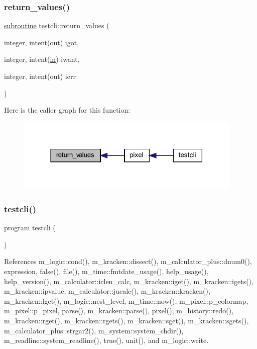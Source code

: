 \subsubsection{\texorpdfstring{return\+\_\+values()}{return\_values()}}
{\footnotesize\ttfamily \hyperlink{M__stopwatch_83_8txt_acfbcff50169d691ff02d4a123ed70482}{subroutine} testcli\+::return\+\_\+values (\begin{DoxyParamCaption}\item[{integer, intent(out)}]{igot,  }\item[{integer, intent(\hyperlink{M__journal_83_8txt_afce72651d1eed785a2132bee863b2f38}{in})}]{iwant,  }\item[{integer, intent(out)}]{ierr }\end{DoxyParamCaption})}

Here is the caller graph for this function\+:
\nopagebreak
\begin{figure}[H]
\begin{center}
\leavevmode
\includegraphics[width=306pt]{shell_8f90_a8e1579319e153f8b8d77b94fa94e9b37_icgraph}
\end{center}
\end{figure}
\mbox{\label{shell_8f90_a19f7365559e8816247241c4721e8eccb}} 
\subsubsection{\texorpdfstring{testcli()}{testcli()}}
{\footnotesize\ttfamily program testcli (\begin{DoxyParamCaption}{ }\end{DoxyParamCaption})}



References m\+\_\+logic\+::cond(), m\+\_\+kracken\+::dissect(), m\+\_\+calculator\+\_\+plus\+::dnum0(), expression, false(), file(), m\+\_\+time\+::fmtdate\+\_\+usage(), help\+\_\+usage(), help\+\_\+version(), m\+\_\+calculator\+::iclen\+\_\+calc, m\+\_\+kracken\+::iget(), m\+\_\+kracken\+::igets(), m\+\_\+kracken\+::ipvalue, m\+\_\+calculator\+::jucalc(), m\+\_\+kracken\+::kracken(), m\+\_\+kracken\+::lget(), m\+\_\+logic\+::nest\+\_\+level, m\+\_\+time\+::now(), m\+\_\+pixel\+::p\+\_\+colormap, m\+\_\+pixel\+::p\+\_\+pixel, parse(), m\+\_\+kracken\+::parse(), pixel(), m\+\_\+history\+::redo(), m\+\_\+kracken\+::rget(), m\+\_\+kracken\+::rgets(), m\+\_\+kracken\+::sget(), m\+\_\+kracken\+::sgets(), m\+\_\+calculator\+\_\+plus\+::strgar2(), m\+\_\+system\+::system\+\_\+chdir(), m\+\_\+readline\+::system\+\_\+readline(), true(), unit(), and m\+\_\+logic\+::write.

